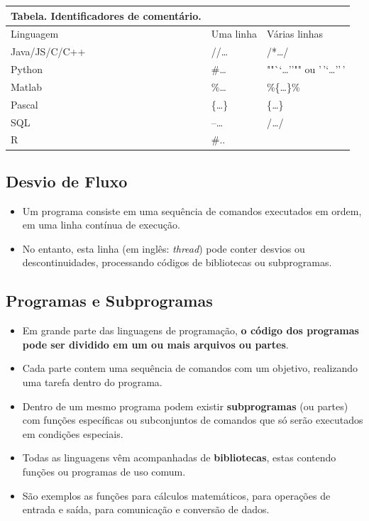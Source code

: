 \documentclass[12pt,a4paper]{article}
\begin{document}
    \begin{longtable}[]{@{}lll@{}}
\toprule
Tabela. Identificadores de comentário. & &\tabularnewline
\midrule
\endhead
Linguagem & Uma linha & Várias linhas\tabularnewline
Java/JS/C/C++ & //\ldots{} & /*\ldots*/\tabularnewline
Python & \#\ldots{} & ""``\ldots{}''"" ou
'\,'`\ldots{}''\,'\tabularnewline
Matlab & \%\ldots{} & \%\{\ldots\}\%\tabularnewline
Pascal & \{\ldots\} & \{\emph{\ldots{}}\}\tabularnewline
SQL & --\ldots{} & /\emph{\ldots{}}/\tabularnewline
R & \#.. &\tabularnewline
\bottomrule
\end{longtable}

    \hypertarget{desvio-de-fluxo}{%
\subsection{Desvio de Fluxo}\label{desvio-de-fluxo}}

    \begin{itemize}
\item
  Um programa consiste em uma sequência de comandos executados em ordem,
  em uma linha contínua de execução.
\item
  No entanto, esta linha (em inglês: \emph{thread}) pode conter desvios
  ou descontinuidades, processando códigos de bibliotecas ou
  subprogramas.
\end{itemize}

    \hypertarget{programas-e-subprogramas}{%
\subsection{Programas e Subprogramas}\label{programas-e-subprogramas}}

    \begin{itemize}
\item
  Em grande parte das linguagens de programação, \textbf{o código dos
  programas pode ser dividido em um ou mais arquivos ou partes}.
\item
  Cada parte contem uma sequência de comandos com um objetivo,
  realizando uma tarefa dentro do programa.
\item
  Dentro de um mesmo programa podem existir \textbf{subprogramas} (ou
  partes) com funções específicas ou subconjuntos de comandos que só
  serão executados em condições especiais.
\item
  Todas as linguagens vêm acompanhadas de \textbf{bibliotecas}, estas
  contendo funções ou programas de uso comum.
\item
  São exemplos as funções para cálculos matemáticos, para operações de
  entrada e saída, para comunicação e conversão de dados.
\end{itemize}
\end{document}
